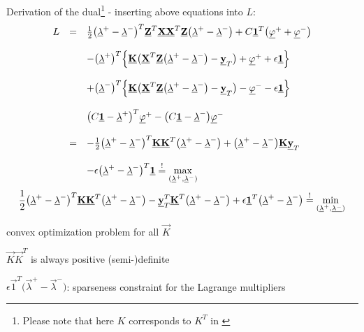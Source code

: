 Derivation of the dual\footnote{Please note that here $K$ corresponds to $K^T$ in \textcite{HochreiterObermayer2006}} - inserting above equations into $L$: 
\begin{equation}
	\begin{array}{lll}
	L 
	& = & \frac{1}{2} \big( \vec{\lambda}^+ - \vec{\lambda}^- \big)^T
		\vec{Z}^T \vec{X} \vec{X}^T \vec{Z} \big( \vec{\lambda}^+ -
		\vec{\lambda}^- \big) + C \vec{1}^T \big( \vec{\varphi}^+
		+ \vec{\varphi}^- \big) 
		\\\\
	&& - \big( \vec{\lambda}^+ \big)^T \Big\{ \vec{K} \big( \vec{X}^T 
		\vec{Z} \big( \vec{\lambda}^+ - \vec{\lambda}^- \big) - 
		\vec{y}_T \big) + \vec{\varphi}^+ + \epsilon \vec{1} \Big\}
		\\\\
	&& + \big( \vec{\lambda}^- \big)^T \Big\{ \vec{K} \big( \vec{X}^T 
		\vec{Z} \big( \vec{\lambda}^+ - \vec{\lambda}^- \big) - 
		\vec{y}_T \big) - \vec{\varphi}^- - \epsilon \vec{1} \Big\}
		\\\\
	&& \big( C \vec{1} - \vec{\lambda}^+ \big)^T \vec{\varphi}^+ - 
		\big( C \vec{1} - \vec{\lambda}^- \big) \vec{\varphi}^-
		\\\\
	& = & - \frac{1}{2} \big( \vec{\lambda}^+ - \vec{\lambda}^- \big)^T \vec{K} 
		\vec{K}^T \big( \vec{\lambda}^+ - \vec{\lambda}^- \big)
		+ \big( \vec{\lambda}^+ - \vec{\lambda}^- \big) 
		\vec{K} \vec{y}_T 
		\\\\
	&& - \epsilon \big( \vec{\lambda}^+ - \vec{\lambda}^- \big)^T \vec{1}
		\eqexcl \max\limits_{(\vec{\lambda}^+, \vec{\lambda}^-)}
	\end{array}
\end{equation}
\begin{equation}
\frac{1}{2}	\big( \vec{\lambda}^+ - \vec{\lambda}^- \big)^T \vec{K} \vec{K}^T 
		\big( \vec{\lambda}^+ - \vec{\lambda}^- \big) - 
		\vec{y}_T^T \vec{K}^T \big( \vec{\lambda}^+ - \vec{\lambda}^-
		\big) + \epsilon \vec{1}^T \big( \vec{\lambda}^+ - 
		\vec{\lambda}^- \big) \eqexcl \min_{(\vec{\lambda}^+,
		\vec{\lambda^-})}
\end{equation}
\begin{itemize}
	\itR convex optimization problem for all $\vec{K}$
	\begin{itemize}
		\itl $\vec{K} \vec{K}^T$ is always positive (semi-)definite
	\end{itemize}
	\itR $\epsilon \vec{1}^T \big( \vec{\lambda}^+ - \vec{\lambda}^- 
		\big)$: sparseness constraint for the Lagrange multipliers
\end{itemize}
